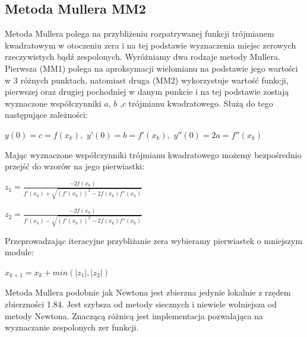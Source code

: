 \documentclass[a4paper, 11pt]{article}
\begin{document}
\subsection{Metoda Mullera MM2}
Metoda Mullera polega na przybliżeniu rozpatrywanej funkcji trójmianem kwadratowym w otoczeniu zera i na tej podstawie wyznaczenia miejsc zerowych rzeczywistych bądź zespolonych. Wyróżniamy dwa rodzaje metody Mullera. Pierwsza (MM1) polega na aproksymacji wielomianu na podstawie jego wartości w 3 różnych punktach, natomiast druga (MM2) wykorzystuje wartość funkcji, pierwszej oraz drugiej pochodniej w danym punkcie i na tej podstawie zostają wyznaczone współczynniki $a$, $b$ ,$c$ trójmianu kwadratowego. Służą do tego następujące zależności:
\begin{center}
$y(0) = c = f(x_{k}),$
$y'(0) = b = f'(x_{k}),$
$y''(0) = 2a = f''(x_{k})$
\end{center}
Mając wyznaczone współczynniki trójmianu kwadratowego możemy bezpośrednio przejść do wzorów na jego pierwiastki:
\begin{center}
$z_{1} = \frac{-2f(x_{k})}{f'(x_{k})+\sqrt{(f'(x_{k}))^2-2f(x_{k})f''(x_{k})}}$
\end{center}
\begin{center}
$z_{2} = \frac{-2f(x_{k})}{f'(x_{k})-\sqrt{(f'(x_{k}))^2-2f(x_{k})f''(x_{k})}}$
\end{center}
Przeprowadzając iteracyjne przybliżanie zera wybieramy pierwiastek o mniejszym module:
\begin{center}
$x_{k+1} = x_{k}+min(|z_{1}|,|z_{2}|)$
\end{center}
Metoda Mullera podobnie jak Newtona jest zbierzna jedynie lokalnie z rzędem zbierzności 1.84. Jest szybsza od metody siecznych i niewiele wolniejsza od metody Newtona. Znaczącą różnicą jest implementacja pozwalająca na wyznaczanie zespolonych zer funkcji. 
\end{document}
